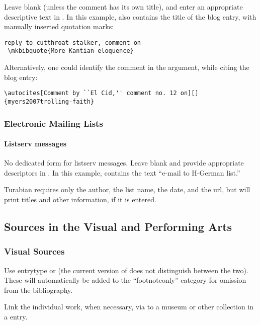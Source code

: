 \documentclass{ltxdockit}[2010/02/12]
\begin{document}
Leave  blank (unless the comment has its own title), and enter an appropriate descriptive text in . In this example,\autocites[][]{dunn200815}  also contains the title of the blog entry, with manually inserted quotation marks:
\begin{verbatim}
reply to cutthroat stalker, comment on
 \mkbibquote{More Kantian eloquence}
\end{verbatim}

Alternatively, one could identify the comment in the  argument, while citing the blog entry:\autocites[Comment by ``El Cid,'' comment no. 12 on][]{myers2007trolling-faith}
\begin{verbatim}
\autocites[Comment by ``El Cid,'' comment no. 12 on][]
{myers2007trolling-faith}
\end{verbatim}

\subsubsection{Electronic Mailing Lists}
\paragraph{Listserv messages}
No dedicated form for listserv messages. Leave  blank and provide appropriate descriptors in .\autocites[][]{weikart2004re:-rev:-glibof} In this example,  contains the text ``e-mail to H-German list.''

Turabian requires only the author, the list name, the date, and the url, but  will print titles and other information, if it is entered.




\subsection{Sources in the Visual and Performing Arts}
\subsubsection{Visual Sources}
Use entrytype  or  (the current version of  does not distinguish between the two). These will automatically be added to the ``footnoteonly'' category for omission from the bibliography.

 Link the individual work, when necessary, via  to a museum or other collection in a  entry. 
 
\end{document}

